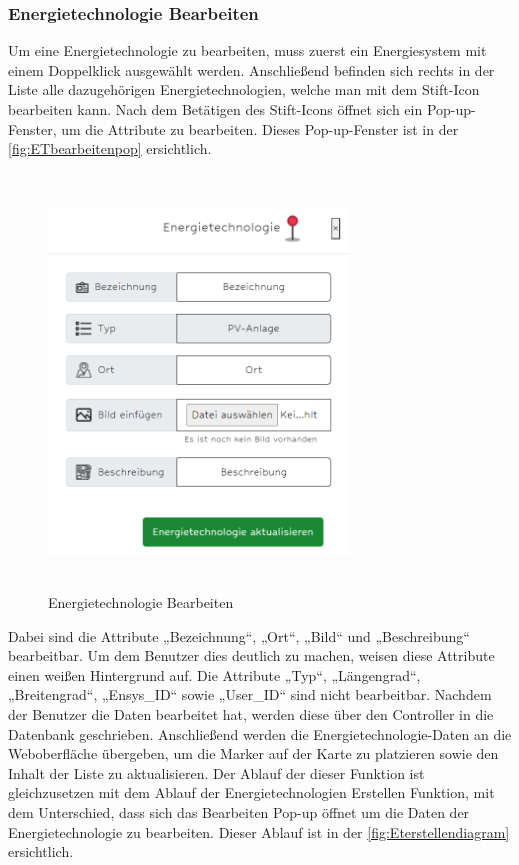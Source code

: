 \newpage
\subsubsection{Energietechnologie Bearbeiten}
Um eine Energietechnologie zu bearbeiten, muss zuerst ein Energiesystem mit einem Doppelklick ausgewählt werden. Anschließend befinden sich rechts in der Liste alle dazugehörigen Energietechnologien, welche man mit dem Stift-Icon bearbeiten kann. Nach dem Betätigen des Stift-Icons öffnet sich ein Pop-up-Fenster, um die Attribute zu bearbeiten. Dieses Pop-up-Fenster ist in der \autoref{fig:ETbearbeitenpop} ersichtlich.
\newline
\begin{figure}[h]
	\centering
	\includegraphics[height=11cm,width=8cm]{images/ETbearbeitenPop}
	\caption{Energietechnologie Bearbeiten}
	\label{fig:ETbearbeitenpop}
\end{figure}


Dabei sind die Attribute „Bezeichnung“, „Ort“, „Bild“ und „Beschreibung“ bearbeitbar. Um dem Benutzer dies deutlich zu machen, weisen diese Attribute einen weißen Hintergrund auf. 
Die Attribute „Typ“, „Längengrad“, „Breitengrad“, „Ensys\_ID“ sowie „User\_ID“ sind nicht bearbeitbar.
Nachdem der Benutzer die Daten bearbeitet hat, werden diese über den Controller in die Datenbank geschrieben. Anschließend werden die Energietechnologie-Daten an die Weboberfläche übergeben, um die Marker auf der Karte zu platzieren sowie den Inhalt der Liste zu aktualisieren. Der Ablauf der dieser Funktion ist gleichzusetzen mit dem Ablauf der Energietechnologien Erstellen Funktion, mit dem Unterschied, dass sich das Bearbeiten Pop-up öffnet um die Daten der Energietechnologie zu bearbeiten. Dieser Ablauf ist in der \autoref{fig:Eterstellendiagram} ersichtlich. 


